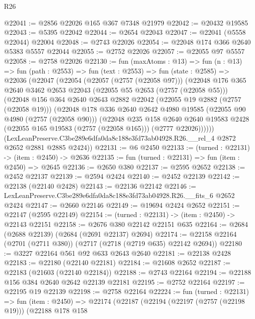 \begin{lexlean}{R26}
\begin{coremodule}
@22041 := @2856 @22026 @165 @367 @7348 @21979
@22042 := @20432 @19585
@22043 := @5395 @22042
@22044 := @2654 @22043
@22047 := @22041 (@5558 @22044) @22004
@22048 := @2743 @22026
@22054 := @22048 @174 @366 @2640 @5383 @5557 @22044
@22055 := @2752 @22026
@22057 := @22055 @97 @5557
@22058 := @2758 @22026
@22130 := fun (maxAtoms : @13) =>
  fun (n : @13) =>
  fun (path : @2553) =>
  fun (text : @2553) =>
  fun (state : @2585) =>
  @22036
    (@22047
      (@22054
        (@22057 (@2757 (@22058 @97)))
        (@22048
          @176
          @365
          @2640
          @3462
          @2653
          @22043
          (@22055 @55 @2653 (@2757 (@22058 @55)))
          (@22048
            @156
            @364
            @2640
            @2643
            @2882
            @22042
            (@22055 @19 @2882 (@2757 (@22058 @19)))
            (@22048
              @178
              @336
              @2640
              @2642
              @4980
              @19585
              (@22055 @90 @4980 (@2757 (@22058 @90)))
              (@22048
                @235
                @158
                @2640
                @2640
                @19583
                @2428
                (@22055 @165 @19583 (@2757 (@22058 @165)))
                (@2777 @22026))))))
      (LexLeanPreserve.C3be289e6dfa0da8c188e3fd73ab04928.R26.__rel_4 @2872 @2652 @2881 @2885 @2424))
@22131 := @6 @2450
@22133 := (turned : @22131) -> (item : @2450) -> @2636
@22135 := fun (turned : @22131) => fun (item : @2450) => @2645
@22136 := @2650 @380
@22137 := @2595 @2652
@22138 := @2452 @22137
@22139 := @2594 @2424
@22140 := @2452 @22139
@22142 := @22138 (@22140 @2428)
@22143 := @22136 @22142
@22146 := LexLeanPreserve.C3be289e6dfa0da8c188e3fd73ab04928.R26.__fits_6 @2652 @2424
@22147 := @2660 @22146
@22149 := @19694 @2424 @2652
@22151 := @22147 (@2595 @22149)
@22154 := (turned : @22131) -> (item : @2450) -> @22143 @22151
@22158 := @2676 @380 @22142 @22151 @635
@22164 := @2684 (@2688 @22139) (@2684 (@2691 @22137) @2694)
@22174 := @22158 @22164 (@2701 (@2711 @380)) (@2717 (@2718 (@2719 @635) @22142 @2694))
@22180 := @3227 @22164 @561 @92 @633 @2643 @2640
@22181 := @22138 @2428
@22183 := @22180 (@22140 @22181)
@22184 := @21608 @2652
@22187 := @22183 (@21603 (@22140 @22184))
@22188 := @2743 @22164
@22194 := @22188 @156 @384 @2640 @2642 @22139 @22181
@22195 := @2752 @22164
@22197 := @22195 @19 @22139
@22198 := @2758 @22164
@22224 := fun (turned : @22131) =>
  fun (item : @2450) =>
  @22174
    (@22187
      (@22194
        (@22197 (@2757 (@22198 @19)))
        (@22188
          @178
          @158

\end{coremodule}
\end{lexlean}
